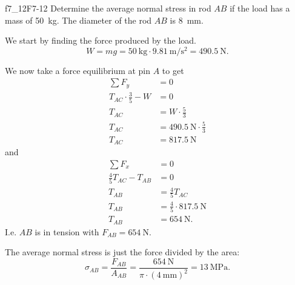 
\begin{problemwithimage}{f7_12}{F7-12}
  Determine the average normal stress in rod $AB$ if the load has a mass of \qty{50}{\kg}.
  The diameter of the rod $AB$ is \qty{8}{\mm}.
\end{problemwithimage}

\begin{derivation}
  We start by finding the force produced by the load.
  \begin{equation*}
    W = mg = \qty{50}{\kg} \cdot \qty{9.81}{\m\per\square\second}  = \qty{490,5}{\N}
  .\end{equation*}
  
  We now take a force equilibrium at pin $A$ to get
  \begin{align*}
    \sum F_y &= 0 \\
    T_{AC} \cdot \frac{3}{5} - W &= 0 \\
    T_{AC} &= W \cdot \frac{5}{3} \\
    T_{AC} &= \qty{490.5}{\N} \cdot \frac{5}{3} \\
    T_{AC} &= \qty{817.5}{\N}
  \end{align*}
  and
  \begin{align*}
    \sum F_x &= 0 \\
    \frac{4}{5} T_{AC} - T_{AB} &= 0 \\
    T_{AB} &= \frac{4}{5} T_{AC} \\
    T_{AB} &= \frac{4}{5} \cdot \qty{817.5}{\N} \\
    T_{AB} &= \qty{654}{\N}
  .\end{align*}
  I.e. $AB$ is in tension with $F_{AB} = \qty{654}{\N}$.
  
  The average normal stress is just the force divided by the area:
  \begin{equation*}
    \sigma_{AB} = \frac{F_{AB}}{A_{AB}} = \frac{\qty{654}{\N}}{\pi \cdot \left( \qty{4}{\mm}  \right)^2 }  = \qty{13}{\MPa}
  .\end{equation*}
\end{derivation}

